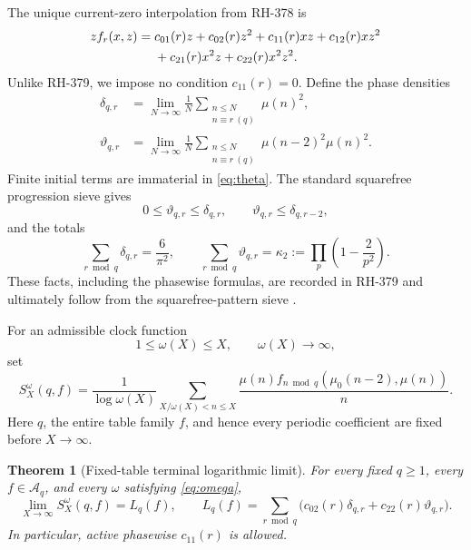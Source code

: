 \documentclass[11pt]{article}
\newtheorem{theorem}{Theorem}[section]
\theoremstyle{definition}
\theoremstyle{remark}
\newcommand{\mob}{\mu}
\newcommand{\dd}{\delta}
\newcommand{\thh}{\vartheta}
\newcommand{\kap}{\kappa_2}
\begin{document}
The unique current-zero interpolation from RH-378 is
\begin{align}
 zf_r(x,z)={}&c_{01}(r)z+c_{02}(r)z^2+c_{11}(r)xz
  +c_{12}(r)xz^2 \notag\\
 &+c_{21}(r)x^2z+c_{22}(r)x^2z^2.
 \label{eq:interpolation}
\end{align}
Unlike RH-379, we impose no condition $c_{11}(r)=0$.  Define the phase
densities
\begin{align}
 \dd_{q,r}&=\lim_{N\to\infty}\frac1N
  \sum_{\substack{n\le N\\n\equiv r\ (q)}}\mob(n)^2,
 \label{eq:delta}\\
 \thh_{q,r}&=\lim_{N\to\infty}\frac1N
  \sum_{\substack{n\le N\\n\equiv r\ (q)}}
  \mob(n-2)^2\mob(n)^2.
 \label{eq:theta}
\end{align}
Finite initial terms are immaterial in \eqref{eq:theta}.  The standard
squarefree progression sieve gives
\begin{equation}
 0\le\thh_{q,r}\le\dd_{q,r},
 \qquad
 \thh_{q,r}\le\dd_{q,r-2},
 \label{eq:density-cone}
\end{equation}
and the totals
\begin{equation}
 \sum_{r\bmod q}\dd_{q,r}=\frac6{\pi^2},
 \qquad
 \sum_{r\bmod q}\thh_{q,r}=\kap
 :=\prod_p\left(1-\frac2{p^2}\right).
 \label{eq:density-totals}
\end{equation}
These facts, including the phasewise formulas, are recorded in RH-379 and
ultimately follow from the squarefree-pattern sieve
\cite{Mirsky1948,RH379}.

For an admissible clock function
\begin{equation}
 1\le\omega(X)\le X,
 \qquad \omega(X)\longrightarrow\infty,
 \label{eq:omega}
\end{equation}
set
\begin{equation}
 S_X^\omega(q,f)=\frac1{\log\omega(X)}
 \sum_{X/\omega(X)<n\le X}
 \frac{\mob(n)f_{n\bmod q}(\mob_0(n-2),\mob(n))}{n}.
 \label{eq:terminal-score}
\end{equation}
Here $q$, the entire table family $f$, and hence every periodic coefficient
are fixed before $X\to\infty$.

\begin{theorem}[Fixed-table terminal logarithmic limit]
\label{thm:limit}
For every fixed $q\ge1$, every $f\in\mathcal A_q$, and every $\omega$
satisfying \eqref{eq:omega},
\begin{equation}
 \lim_{X\to\infty}S_X^\omega(q,f)=L_q(f),
 \qquad
 L_q(f)=\sum_{r\bmod q}
 \bigl(c_{02}(r)\dd_{q,r}+c_{22}(r)\thh_{q,r}\bigr).
 \label{eq:limit-formula}
\end{equation}
In particular, active phasewise $c_{11}(r)$ is allowed.
\end{theorem}
\end{document}
